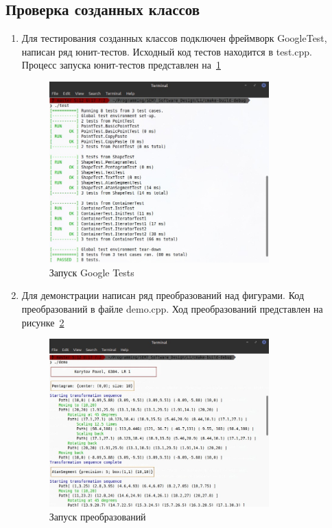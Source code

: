 \documentclass[a4paper, 14pt]{extarticle}
\begin{document}
\FloatBarrier{}
\subsection{Проверка созданных классов}
\begin{enumerate}
    \item Для тестирования созданных классов подключен фреймворк GoogleTest, написан ряд юнит-тестов. Исходный код тестов находится в test.cpp.\\
    Процесс запуска юнит-тестов представлен на~\ref{img:shapes:tests}
    \begin{figure}[h]
        \centering
        \includegraphics[width=0.8\textwidth]{./img/S001.jpg}
        \caption{Запуск Google Tests}%
        \label{img:shapes:tests}
    \end{figure}
    \item Для демонстрации написан ряд преобразований над фигурами. Код преобразований в файле demo.cpp. Ход преобразований представлен на рисунке~\ref{img:shapes:demo}
    \begin{figure}[h]
        \centering
        \includegraphics[width=0.8\textwidth]{./img/S002.jpg}
        \caption{Запуск преобразований}%
        \label{img:shapes:demo}
    \end{figure}
    

\end{enumerate}
\end{document}
